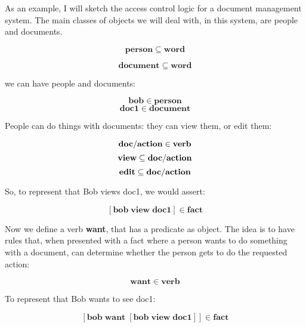 \documentclass{IOS-Book-Article}     %
\begin{document}
As an example, I will sketch the access control logic for a
document management system. The main classes of objects we will deal with,
in this system, are people and documents.

\begin{equation}
  \mathbf{person \subseteq word}
\end{equation}

\begin{equation}
  \mathbf{document \subseteq word}
\end{equation}

we can have people and documents:

\begin{equation}
  \mathbf{bob \in person}
\end{equation}
\begin{equation}
  \mathbf{doc1 \in document}
\end{equation}

People can do things with documents: they can view them, or edit them:

\begin{equation}
  \mathbf{doc\-/action \in verb}
\end{equation}
\begin{equation}
  \mathbf{view \subseteq doc\-/action}
\end{equation}
\begin{equation}
  \mathbf{edit \subseteq doc\-/action}
\end{equation}

So, to represent that Bob views doc1, we would assert:

\begin{equation}
  \mathbf{\left[bob\; view\; doc1\right] \in fact}
\end{equation}

Now we define a verb \textbf{want}, that has a predicate as object.
The idea is to have rules that, when presented with a fact
where a person wants to do something with a document,
can determine whether the  person gets to do the requested action:

\begin{equation}
  \mathbf{want \in verb}
\end{equation}

To represent that Bob wants to see doc1:

\begin{equation}
  \mathbf{\left[bob\; want\; \left[bob\; view\; doc1\right]\right] \in fact}
\end{equation}
\end{document}
